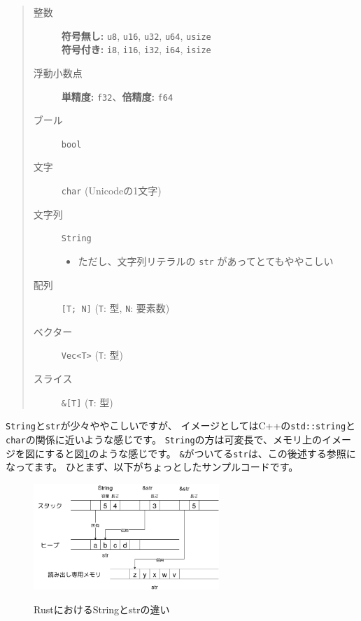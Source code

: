 \documentclass[mingoth,a4paper]{jsarticle}
\begin{document}
\begin{quote}
\begin{description}
 \item[整数]
	    \textbf{符号無し:} \texttt{u8}, \texttt{u16}, \texttt{u32}, \texttt{u64}, \texttt{usize}\\
	    \textbf{符号付き:} \texttt{i8}, \texttt{i16}, \texttt{i32}, \texttt{i64}, \texttt{isize}
 \item[浮動小数点] \textbf{単精度:} \texttt{f32}、\textbf{倍精度:} \texttt{f64}
 \item[ブール] \texttt{bool}
 \item[文字] \texttt{char}  (Unicodeの1文字)
 \item[文字列] \texttt{String}
	    \begin{itemize}
	     \item ただし、文字列リテラルの \texttt{str} があってとてもややこしい
	    \end{itemize}
 \item[配列] \texttt{[T; N]} (\texttt{T}: 型,  \texttt{N}: 要素数)
 \item[ベクター] \texttt{Vec<T>} (\texttt{T}: 型)
 \item[スライス] \texttt{\&[T]} (\texttt{T}: 型)
\end{description}
\end{quote}

\texttt{String}と\texttt{str}が少々ややこしいですが、
イメージとしてはC++の\texttt{std::string}と\texttt{char}の関係に近いような感じです。
\texttt{String}の方は可変長で、メモリ上のイメージを図にすると図\ref{fig:str-string}のような感じです。
\texttt{\&}がついてる\texttt{str}は、この後述する参照になってます。
ひとまず、以下がちょっとしたサンプルコードです。

\begin{figure}[htbp]
 \begin{center}
  \includegraphics[keepaspectratio,height=4cm]{./image201903/rustlang-str-string.png}
  \label{fig:str-string}
  \caption{RustにおけるStringとstrの違い}
 \end{center}
\end{figure}
\end{document}
